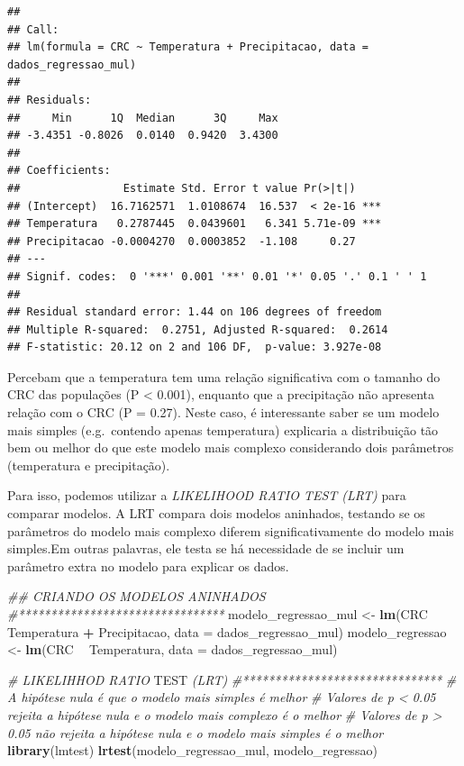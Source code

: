 \documentclass[
]{book}
\newenvironment{Shaded}{\begin{snugshade}}{\end{snugshade}}
\newcommand{\AlertTok}[1]{\textcolor[rgb]{0.94,0.16,0.16}{#1}}
\newcommand{\CommentTok}[1]{\textcolor[rgb]{0.56,0.35,0.01}{\textit{#1}}}
\newcommand{\DataTypeTok}[1]{\textcolor[rgb]{0.13,0.29,0.53}{#1}}
\newcommand{\KeywordTok}[1]{\textcolor[rgb]{0.13,0.29,0.53}{\textbf{#1}}}
\newcommand{\NormalTok}[1]{#1}
\newcommand{\OperatorTok}[1]{\textcolor[rgb]{0.81,0.36,0.00}{\textbf{#1}}}
\newcommand{\StringTok}[1]{\textcolor[rgb]{0.31,0.60,0.02}{#1}}
\begin{document}
\begin{verbatim}
## 
## Call:
## lm(formula = CRC ~ Temperatura + Precipitacao, data = dados_regressao_mul)
## 
## Residuals:
##     Min      1Q  Median      3Q     Max 
## -3.4351 -0.8026  0.0140  0.9420  3.4300 
## 
## Coefficients:
##                Estimate Std. Error t value Pr(>|t|)    
## (Intercept)  16.7162571  1.0108674  16.537  < 2e-16 ***
## Temperatura   0.2787445  0.0439601   6.341 5.71e-09 ***
## Precipitacao -0.0004270  0.0003852  -1.108     0.27    
## ---
## Signif. codes:  0 '***' 0.001 '**' 0.01 '*' 0.05 '.' 0.1 ' ' 1
## 
## Residual standard error: 1.44 on 106 degrees of freedom
## Multiple R-squared:  0.2751,	Adjusted R-squared:  0.2614 
## F-statistic: 20.12 on 2 and 106 DF,  p-value: 3.927e-08
\end{verbatim}

Percebam que a temperatura tem uma relação significativa com o tamanho do CRC das populações (P \textless{} 0.001), enquanto que a precipitação não apresenta relação com o CRC (P = 0.27). Neste caso, é interessante saber se um modelo mais simples (e.g.~contendo apenas temperatura) explicaria a distribuição tão bem ou melhor do que este modelo mais complexo considerando dois parâmetros (temperatura e precipitação).

Para isso, podemos utilizar a \emph{LIKELIHOOD RATIO TEST (LRT)} para comparar modelos. A LRT compara dois modelos aninhados, testando se os parâmetros do modelo mais complexo diferem significativamente do modelo mais simples.Em outras palavras, ele testa se há necessidade de se incluir um parâmetro extra no modelo para explicar os dados.

\begin{Shaded}
\begin{Highlighting}[]
\CommentTok{## CRIANDO OS MODELOS ANINHADOS}
\CommentTok{#********************************}
\NormalTok{modelo_regressao_mul <-}\StringTok{ }\KeywordTok{lm}\NormalTok{(CRC }\OperatorTok{~}\StringTok{ }\NormalTok{Temperatura }\OperatorTok{+}\StringTok{ }\NormalTok{Precipitacao, }\DataTypeTok{data =}\NormalTok{ dados_regressao_mul)}
\NormalTok{modelo_regressao <-}\StringTok{ }\KeywordTok{lm}\NormalTok{(CRC }\OperatorTok{~}\StringTok{ }\NormalTok{Temperatura, }\DataTypeTok{data =}\NormalTok{ dados_regressao_mul)}

\CommentTok{# LIKELIHHOD RATIO }\AlertTok{TEST}\CommentTok{ (LRT)}
\CommentTok{#*******************************}
\CommentTok{# A hipótese nula é que o modelo mais simples é melhor}
\CommentTok{# Valores de p < 0.05 rejeita a hipótese nula e o modelo mais complexo é o melhor}
\CommentTok{# Valores de p > 0.05 não rejeita a hipótese nula e o modelo mais simples é o melhor}
\KeywordTok{library}\NormalTok{(lmtest)}
\KeywordTok{lrtest}\NormalTok{(modelo_regressao_mul, modelo_regressao)}
\end{Highlighting}
\end{Shaded}
\end{document}
